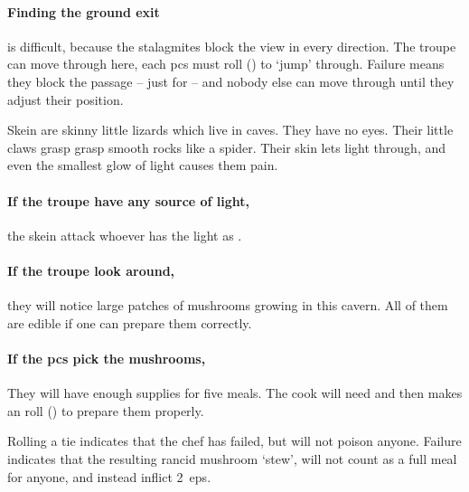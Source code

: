 \begin{multicols}{2}
\paragraph{Finding the ground exit}
is difficult, because the stalagmites block the view in every direction.
The troupe can move through here, each \glspl{pc} must roll  (\tn[10]) to `jump' through.
Failure means they block the passage -- just for  -- and nobody else can move through until they adjust their position.




\begin{exampletext}
  Skein are skinny little lizards which live in caves.
  They have no eyes.
  Their little claws grasp grasp smooth rocks like a spider.
  Their skin lets light through, and even the smallest glow of light causes them pain.
\end{exampletext}

\paragraph{If the troupe have any source of light,}
the skein attack whoever has the light as .

\skeinSwarm

\paragraph{If the troupe look around,}
they will notice large patches of mushrooms growing in this cavern.
All of them are edible if one can prepare them correctly.

\paragraph{If the \glspl{pc} pick the mushrooms,}
They will have enough supplies for five meals.
The cook will need  and then makes an  roll (\tn[10]) to prepare them properly.

Rolling a tie indicates that the chef has failed, but will not poison anyone.
Failure indicates that the resulting rancid mushroom `stew', will not count as a full meal for anyone, and instead inflict 2~\glspl{ep}.


\end{multicols}
